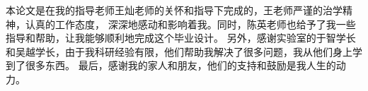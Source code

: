 \begin{thanks}

    本论文是在我的指导老师王灿老师的关怀和指导下完成的，王老师严谨的治学精神，认真的工作态度，
    深深地感动和影响着我。同时，陈英老师也给予了我一些指导和帮助，让我能够顺利地完成这个毕业设计。
    另外，感谢实验室的于智学长和吴越学长，由于我科研经验有限，他们帮助我解决了很多问题，我从他们身上学到了很多东西。
    最后，感谢我的家人和朋友，他们的支持和鼓励是我人生的动力。

\end{thanks}
